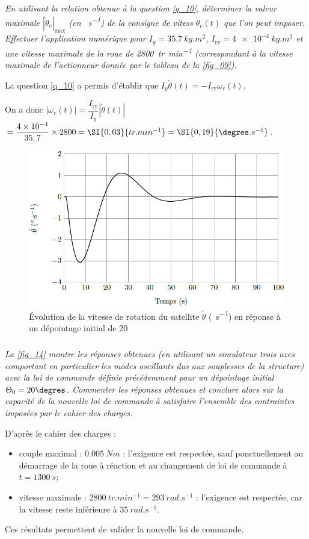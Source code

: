 \subparagraph{\label{q_29}}\textit{En utilisant la relation obtenue à la question \ref{q_10}, déterminer la valeur maximale
$|\dot{\theta}_c|_{\text{max}}$ (en \si{\degres.s^{-1}}) 
de la consigne de vitess $\dot{\theta}_c(t)$ que l’on peut imposer. Effectuer l’application numérique pour $I_y = \SI{35,7}{kg.m^2}$, $I_{\text{ry}}=\SI{4e-4}{kg.m^2}$ et une vitesse maximale de la roue de \SI{2800}{tr.min^{-1}} (correspondant à la vitesse maximale
de l’actionneur donnée par le tableau de la \autoref{fig_09}).}
\ifprof
\begin{corrige}
La question \ref{q_10} a permis d'établir que $I_y \dot{\theta}(t)=-I_{\text{ry}}\omega_r(t)$.

On a donc $\left| \omega_r(t) \right| = \dfrac{I_{\text{ry}}}{I_y}\left|\dot{\theta}(t)\right|$ 
$=\dfrac{4\times 10^{-4}}{35,7} \times 2800 =\SI{0,03}{tr.min^{-1}}=\SI{0,19}{\degres.s^{-1}} $.
\end{corrige}
\else
\fi

\ifprof
\else

\begin{figure}[H]
\centering
\includegraphics[width=.7\linewidth]{images/fig_13}
\caption{Évolution de la vitesse de rotation du satellite $\dot{\theta}$ (\si{\degres.s^{-1}}) en réponse à un dépointage initial de 20\degres \label{fig_13}}
\end{figure}
\fi


\subparagraph{\label{q_30}}\textit{La \autoref{fig_14} montre les réponses obtenues (en utilisant un simulateur trois axes comportant en particulier les modes oscillants dus aux souplesses de la structure) avec la loi de commande définie précédemment pour un dépointage initial $\Theta_0 = 20\degres$. Commenter les réponses obtenues et conclure alors sur la capacité de la nouvelle loi de commande à satisfaire l’ensemble des contraintes imposées par le cahier des charges.}
\ifprof
\begin{corrige}
D'après le cahier des charges : 
\begin{itemize}
\item couple maximal : $\SI{0,005}{Nm}$ : l'exigence est respectée, sauf ponctuellement au démarrage de la roue à réaction et au changement de loi de commande à $t=\SI{1300}{s}$;
\item vitesse maximale : $\SI{2800}{tr.min^{-1}} = \SI{293}{rad.s^{-1}}$ : l'exigence est respectée, car la vitesse reste inférieure à $\SI{35}{rad.s^{-1}}$.
\end{itemize}
Ces résultats permettent de valider la nouvelle loi de commande.
\end{corrige}
\else
\fi

